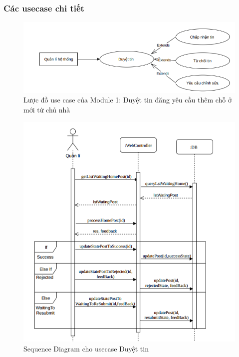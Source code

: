 \subsubsection{Các usecase chi tiết}
\begin{figure}[!h]
	\centering
	\includegraphics[width=12cm]{Image/module1.png}
	\vspace{0.5cm}
	\caption{Lược đồ use case của Module 1: Duyệt tin đăng yêu cầu thêm chỗ ở mới từ chủ nhà}
\end{figure}
\begin{figure}[!h]
	\centering
	\includegraphics[width=13cm]{Image/duyetTinSequence.png}
	\caption{Sequence Diagram cho usecase Duyệt tin}
\end{figure}
